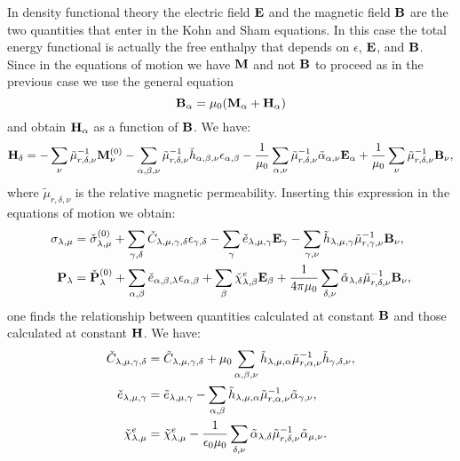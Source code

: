 \documentclass[12pt,a4paper,twoside]{report}
\begin{document}
In density functional theory the electric field ${\bf E}$ and the
magnetic field ${\bf B}$ are the two quantities that enter in the Kohn
and Sham equations. In this case the total energy functional is 
actually the free enthalpy that depends on $\epsilon$, ${\bf E}$, and 
${\bf B}$. 
Since in the equations of motion we have ${\bf M}$ and not ${\bf B}$ 
to proceed as in the previous case we use the general equation
\begin{equation}
{\bf B}_\alpha= \mu_0({\bf M}_\alpha+{\bf H}_\alpha)
\end{equation}
and obtain ${\bf H}_\alpha$ as a function of ${\bf B}$.
We have:
\begin{equation}
{\bf H}_\delta = - \sum_\nu \tilde \mu^{-1}_{r,\delta,\nu} {\bf M}^{(0)}_\nu
- \sum_{\alpha,\beta,\nu} \tilde \mu^{-1}_{r,\delta,\nu} \tilde h_{\alpha,\beta,\nu}
\epsilon_{\alpha,\beta} - {1\over \mu_0} \sum_{\alpha,\nu}
\tilde \mu^{-1}_{r,\delta,\nu} \tilde \alpha_{\alpha,\nu} {\bf E}_\alpha
+ {1\over \mu_0} \sum_\nu \tilde \mu^{-1}_{r,\delta,\nu} {\bf B}_\nu, 
\end{equation}
where $\tilde \mu_{r,\delta,\nu}$ is the relative magnetic
permeability.
Inserting this expression in the equations of motion we obtain:
\begin{align}
\sigma_{\lambda,\mu}&=  \check \sigma_{\lambda,\mu}^{(0)}
+\sum_{\gamma,\delta} \check C_{\lambda,\mu,\gamma,\delta}  
\epsilon_{\gamma,\delta} -
\sum_{\gamma} \check e_{\lambda,\mu,\gamma} 
 {\bf E}_{\gamma}
-\sum_{\gamma,\nu}  \tilde h_{\lambda,\mu,\gamma} 
\tilde \mu^{-1}_{r,\gamma,\nu} {\bf B}_{\nu}, \\
{\bf P}_{\lambda}&= \check {\bf P}^{(0)}_{\lambda}
+\sum_{\alpha,\beta} \check e_{\alpha,\beta,\lambda} 
\epsilon_{\alpha,\beta} +
\sum_{\beta} 
\check \chi^e_{\lambda,\beta}
{\bf E}_{\beta} +
{1\over 4 \pi \mu_0}\sum_{\delta,\nu} \tilde \alpha_{\lambda,\delta} 
\tilde \mu^{-1}_{r,\delta,\nu}  
{\bf B}_{\nu}, 
\end{align}
one finds the relationship between quantities calculated at constant 
${\bf B}$ and those calculated at constant ${\bf H}$. We have:
\begin{align}
\check C_{\lambda,\mu,\gamma,\delta} &=
\tilde C_{\lambda,\mu,\gamma,\delta} + \mu_0 \sum_{\alpha,\beta,\nu}
\tilde h_{\lambda,\mu,\alpha} \tilde \mu^{-1}_{r,\alpha,\nu} 
\tilde h_{\gamma,\delta,\nu}, \\
\check e_{\lambda,\mu,\gamma}&= \tilde e_{\lambda,\mu,\gamma}
-\sum_{\alpha,\beta} \tilde h_{\lambda,\mu,\alpha} 
\tilde \mu^{-1}_{r,\alpha,\nu}
\tilde \alpha_{\gamma,\nu}, \\
\check \chi^e_{\lambda,\mu}&= \tilde \chi^e_{\lambda,\mu}
-{1\over \epsilon_0 \mu_0} \sum_{\delta,\nu} \tilde \alpha_{\lambda,\delta} 
\tilde \mu^{-1}_{r,\delta,\nu} \tilde \alpha_{\mu,\nu}. 
\end{align}
\end{document}
